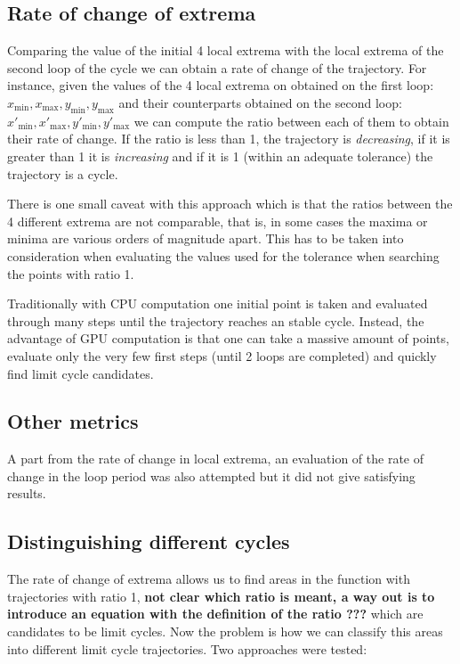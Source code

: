 \pagebreak

\subsection{Rate of change of extrema}

Comparing the value of the initial 4 local extrema with the local extrema of the second loop of the cycle we can obtain a rate of change of the trajectory. For instance, given the values of the 4 local extrema on obtained on the first loop: $x_{\min}, x_{\max}, y_{\min}, y_{\max}$ and their counterparts obtained on the second loop: $x'_{\min}, x'_{\max}, y'_{\min}, y'_{\max}$ we can compute the ratio between each of them to obtain their rate of change. If the ratio is less than 1, the trajectory is \emph{decreasing}, if it is greater than 1 it is \emph{increasing} and if it is 1 (within an adequate tolerance) the trajectory is a cycle.

There is one small caveat with this approach which is that the ratios between the 4 different extrema are not comparable, that is, in some cases the maxima or minima are various orders of magnitude apart. This has to be taken into consideration when evaluating the values used for the tolerance when searching the points with ratio 1.

Traditionally with CPU computation one initial point is taken and evaluated through many steps until the trajectory reaches an stable cycle. Instead, the advantage of GPU computation is that one can take a massive amount of points, evaluate only the very few first steps (until 2 loops are completed) and quickly find limit cycle candidates.

\subsection{Other metrics}

A part from the rate of change in local extrema, an evaluation of the rate of change in the loop period was also attempted but it did not give satisfying results.

\subsection{Distinguishing different cycles}

The rate of change of extrema allows us to find areas in the function with trajectories with ratio 1, 
{\bf not clear which ratio is meant, a way out is to introduce an equation with the definition of the ratio ???}
which are candidates to be limit cycles. Now the problem is how we can classify this areas into different limit cycle trajectories. Two approaches were tested:

